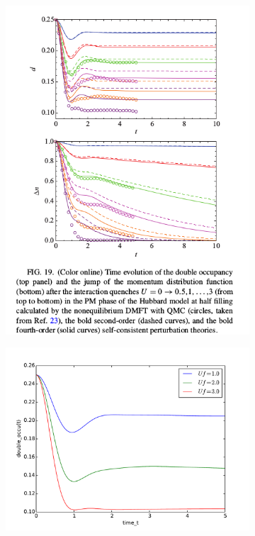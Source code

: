 \begin{figure}[H]
\begin{subfigure}{.5\textwidth}
 \includegraphics[width=1.1\linewidth]{bench_marking/HUB_para_quench_literature_small_U.png}
  \caption{}
\end{subfigure}%
\begin{subfigure}{.5\textwidth}
  \includegraphics[width=1.1\linewidth]{bench_marking/HUB_para_quench_code_small_U.pdf}
  \caption{}
\end{subfigure}
\end{figure}

